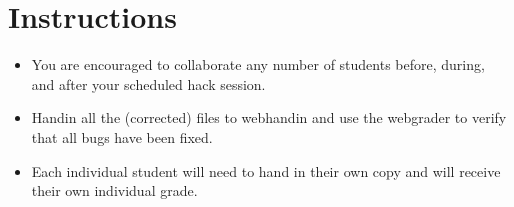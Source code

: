 \documentclass[12pt]{scrartcl}
\begin{document}
\section*{Instructions}

\begin{itemize}
  \item You are encouraged to collaborate any number of students 
  before, during, and after your scheduled hack session.  
  \item Handin all the (corrected) files to webhandin and use
  the webgrader to verify that all bugs have been fixed.
  \item Each individual student will need
  to hand in their own copy and will receive their own individual
  grade.
\end{itemize}

%
%  
%
\end{document}
